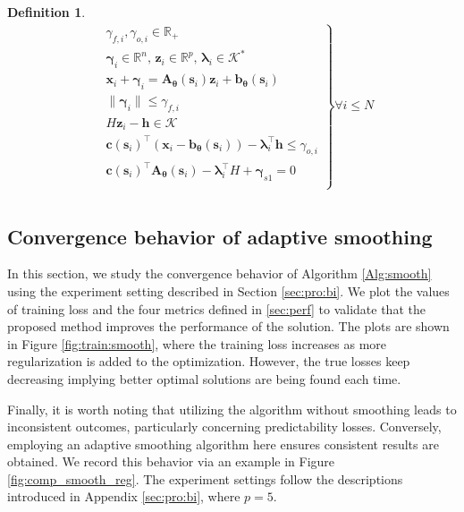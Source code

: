 \documentclass{article}
\def\bgamma{\bm{\gamma}}
\theoremstyle{plain}
\newtheorem{definition}[theorem]{Definition}
\begin{document}
\begin{definition}
\begin{subequations}
\begin{equation}
\begin{array}{rll}
    &\left.
    \!\!\!\begin{array}{l}
    \gamma_{f,i},\gamma_{o,i}\in\mathbb{R}_+\\ \bm\gamma_i\in\mathbb{R}^n,\,\bm z_i\in\mathbb{R}^p,\, \bm \lambda_i \in \mathcal K^*\\
    \bm x_i + \bm \gamma_{i} = \bm A_{\bm\theta}(\bm s_i)\bm z_i + \bm b_{\bm\theta}(\bm s_i) \\
    \|\bm \gamma_i\|\leq \gamma_{f,i}\\
     H\bm z_i - \bm h \in \mathcal{K}\\
     \bm c(\bm s_i)^\top(\bm x_i-\bm b_{\bm\theta}(\bm s_i)) - \bm \lambda_i^\top \bm h \leq \gamma_{o,i}\\
     \bm c(\bm s_i)^\top\bm A_{\bm\theta}(\bm s_i) - \bm \lambda_i^\top H + \bgamma_{s1} = 0 \\
     \end{array}
    \right\} \forall i\leq N\\
    \end{array}
\end{equation}
\end{subequations}
\end{definition}




\subsection{Convergence behavior of adaptive smoothing} \label{app:smooth:exp}

In this section, we study the convergence behavior of Algorithm \ref{Alg:smooth} using the experiment setting described in Section \ref{sec:pro:bi}. We plot the values of training loss and the four metrics defined in \ref{sec:perf} to validate that the proposed method improves the performance of the solution. The plots are shown in Figure \ref{fig:train:smooth}, where the training loss increases as more regularization is added to the optimization. However, the true losses keep decreasing implying better optimal solutions are being found each time.

Finally, it is worth noting that utilizing the algorithm without smoothing leads to inconsistent outcomes, particularly concerning predictability losses. Conversely, employing an adaptive smoothing algorithm here ensures consistent results are obtained. We record this behavior via an example in Figure \ref{fig:comp_smooth_reg}. The experiment settings follow the descriptions introduced in Appendix \ref{sec:pro:bi}, where $p = 5$.
\end{document}
